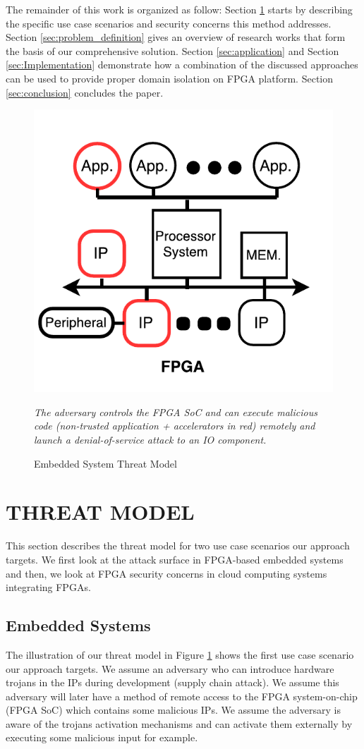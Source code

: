 \documentclass[sigconf]{acmart}
\theoremstyle{plain}
\theoremstyle{remark}
\begin{document}
The remainder of this work is organized as follow: Section \ref{sec:threat_model} starts by describing the specific use case scenarios and security concerns this method addresses. Section \ref{sec:problem_definition} gives an overview of research works that form the basis of our comprehensive solution. Section \ref{sec:application} and Section \ref{sec:Implementation} demonstrate how a combination of the discussed approaches can be used to provide proper domain isolation on FPGA platform. Section \ref{sec:conclusion} concludes the paper.

\begin{figure}[h]
\centering
\includegraphics[width=0.5\columnwidth]{figures/ThreatModel.pdf}
\caption{Embedded System Threat Model}
\textit{The adversary controls the FPGA SoC and can execute malicious code (non-trusted application + accelerators in red) remotely and launch a denial-of-service attack to an IO component.}
\label{fig:threat}
\end{figure}

\section{THREAT MODEL} \label{sec:threat_model}

This section describes the threat model for two use case scenarios our approach targets. We first look at the attack surface in FPGA-based embedded systems and then, we look at FPGA security concerns in cloud computing systems integrating FPGAs.

\subsection{Embedded Systems}

The illustration of our threat model in Figure \ref{fig:threat} shows the first use case scenario our approach targets. We assume an adversary who can introduce hardware trojans in the IPs during development (supply chain attack). We assume this adversary will later have a method of remote access to the FPGA system-on-chip (FPGA SoC) which contains some malicious IPs. We assume the adversary is aware of the trojans activation mechanisms and can activate them externally by executing some malicious input for example.
\end{document}
